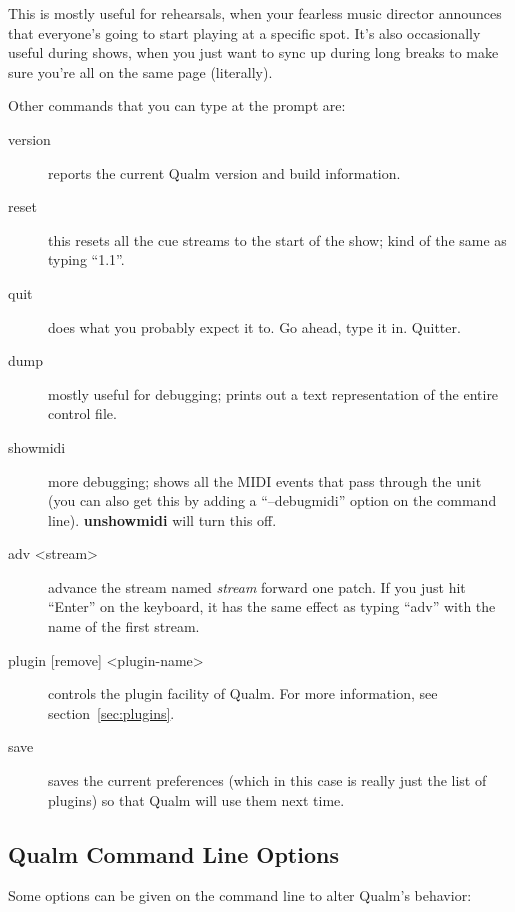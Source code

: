 \documentclass{article}
\newcommand{\q}{{\textsf{Qualm}}\xspace}
\begin{document}
This is mostly useful for rehearsals, when your fearless music
director announces that everyone's going to start playing at a specific
spot.  It's also occasionally useful during shows, when you just want
to sync up during long breaks to make sure you're all on the same page
(literally).

Other commands that you can type at the prompt are:

\begin{description}
\item[version] reports the current \q version and build
      information.

\item[reset] this resets all the cue streams to the start of the
      show; kind of the same as typing ``1.1''.

\item[quit] does what you probably expect it to.  Go ahead, type it
      in.  Quitter.

\item[dump] mostly useful for debugging; prints out a text
      representation of the entire control file.

\item[showmidi] more debugging; shows all the MIDI events that pass
      through the unit (you can also get this by adding a ``--debugmidi''
      option on the command line).  {\bf unshowmidi} will turn this
      off.

\item[adv <stream>] advance the stream named {\em stream}
      forward one patch.  If you just hit ``Enter'' on the keyboard,
      it has the same effect as typing ``adv'' with the name of the
      first stream.

\item[plugin {[remove]} <plugin-name>] controls
      the plugin facility of \q.  For more information, see
      section~\ref{sec:plugins}.

\item[save] saves the current preferences (which in this case is
      really just the list of plugins) so that \q will use them next
      time.
\end{description}

\subsection{\q Command Line Options}

Some options can be given on the command line to alter \q's behavior:
\end{document}

